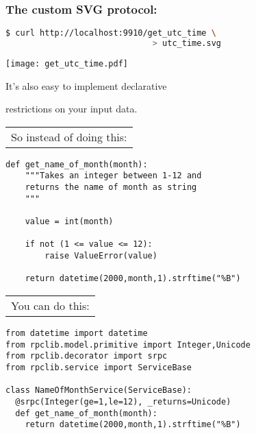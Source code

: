 \documentclass{beamer}
\begin{document}
\begin{frame}[fragile]
\frametitle{The custom SVG protocol:}

  \begin{lstlisting}[language=sh]
$ curl http://localhost:9910/get_utc_time \
                              > utc_time.svg
  \end{lstlisting}

  \begin{center}
    \texttt{[image: get\_utc\_time.pdf]}
  \end{center}
\end{frame}

\begin{frame}

  \begin{center}
  \LARGE
    It's also easy to implement declarative

    \bigskip

    restrictions on your input data.
  \end{center}

\end{frame}

\begin{frame}[fragile]
  \begin{tabular}{l}
  \LARGE So instead of doing this:
  \end{tabular}

  \bigskip

  \begin{lstlisting}
def get_name_of_month(month):
    """Takes an integer between 1-12 and
    returns the name of month as string
    """

    value = int(month)

    if not (1 <= value <= 12):
        raise ValueError(value)

    return datetime(2000,month,1).strftime("%B")
  \end{lstlisting}
\end{frame}

\begin{frame}[fragile]
  \begin{tabular}{l}
  \LARGE You can do this:
  \end{tabular}

  \bigskip

  \begin{lstlisting}[emph={Integer,le,ge}]
from datetime import datetime
from rpclib.model.primitive import Integer,Unicode
from rpclib.decorator import srpc
from rpclib.service import ServiceBase

class NameOfMonthService(ServiceBase):
  @srpc(Integer(ge=1,le=12), _returns=Unicode)
  def get_name_of_month(month):
    return datetime(2000,month,1).strftime("%B")
  \end{lstlisting}
\end{frame}
\end{document}
